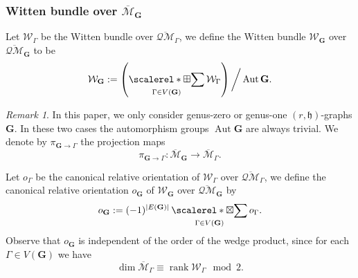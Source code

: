 \documentclass[11pt]{amsart}
\theoremstyle{definition}
\theoremstyle{remark}
\newtheorem{rmk}[dummy]{Remark}
\newcommand{\oQMb}{{\overline{\mathcal{QM}}}}
\newcommand{\<}{\left<}
\renewcommand{\>}{\right>}
\numberwithin{equation}{section}
\def\Mbar{{\overline{\mathcal M}}}
\def\h{{\mathfrak h}}
\DeclareMathOperator*{\bboxplus}{\scalerel*{\boxplus}{\sum}}
\DeclareMathOperator*{\bboxtimes}{\scalerel*{\boxtimes}{\sum}}
\begin{document}
\subsubsection{Witten bundle over $\Mbar_\mathbf{G}$}
Let $\mathcal W_\Gamma$ be the Witten bundle over $\oQMb_\Gamma$, we define the Witten bundle $\mathcal W_\mathbf{G}$ over $\oQMb_\mathbf{G}$ to be 
$$
 \mathcal W_\mathbf{G}:= \left(\bboxplus_{\Gamma\in V(\mathbf{G})}\mathcal W_\Gamma\right)\bigg\slash \operatorname{Aut} \mathbf{G}.
$$
\begin{rmk}\label{rmk aut trivial}
    In %
this %
paper,  we %
only consider genus-zero or genus-one  $(r,\h)$-graphs $\mathbf{G}$. In these two cases the automorphism groups $\operatorname{Aut}\mathbf{G}$ are always trivial. We denote by $\pi_{\mathbf{G}\to\Gamma}$ the projection %
maps 
    $$
\pi_{\mathbf{G}\to\Gamma}\colon \Mbar_{\mathbf{G}}\to \Mbar_\Gamma. 
$$
\end{rmk}
Let $o_\Gamma$ %
be the canonical relative orientation of $\mathcal W_\Gamma$ over $\oQMb_\Gamma$, we define the canonical relative orientation $o_\mathbf{G}$ of $\mathcal W_\mathbf{G}$ over $\oQMb_\mathbf{G}$ by
\begin{equation}\label{eq orientation point insertion}
    o_\mathbf{G}:=(-1)^{\lvert E(\mathbf{G})\rvert}\bboxtimes_{\Gamma\in V(\mathbf{G})}  o_\Gamma.
\end{equation}
Observe that $o_\mathbf{G}$ is independent of the order of the wedge product, since for each $\Gamma\in V(\mathbf{G})$ we have 
$$
\dim \Mbar_\Gamma \equiv \operatorname{rank} \mathcal W_\Gamma \mod 2.
$$
\end{document}
